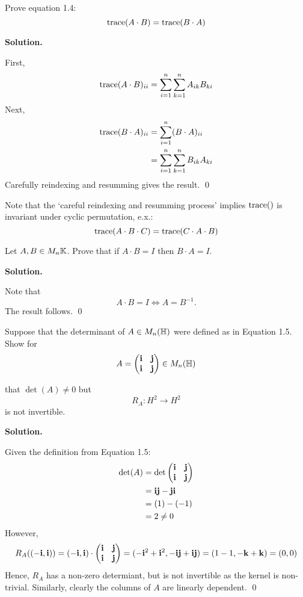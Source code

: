 \documentclass[12pt]{book}
\theoremstyle{definition}
\newenvironment{solution}
{%
  \par\noindent\textbf{Solution.}\quad
}
{%
  \qed\par
}
\begin{document}
\begin{taggedexercise}[Complete]
  Prove equation 1.4:
\[
\text{trace}({A \cdot B}) = \text{trace}({B \cdot A})
\]
\end{taggedexercise}

\begin{solution}
  First,
  \[
    \begin{aligned}
      \text{trace}({A \cdot B})_{ii} &= \sum_{i=1}^n \sum_{k=1}^n A_{ik}B_{ki} \\
   \end{aligned}
  \]
  Next,
  \[
    \begin{aligned}
      \text{trace}({B \cdot A})_{ii} &= \sum_{i=1}^{n} (B \cdot A)_{ii} \\
                          &= \sum_{i=1}^n \sum_{k=1}^n B_{ik}A_{ki} \\
   \end{aligned}
  \]
  Carefully reindexing and resumming gives the result.
\end{solution}
Note that the `careful reindexing and resumming process' implies $\text{trace}({})$ is invariant under cyclic permutation, e.x.:
\[
  \text{trace}({A \cdot B \cdot C}) = \text{trace}({C \cdot A \cdot B})
\]

\begin{taggedexercise}[Complete]
  Let $A, B \in M_n{\mathbb{K}}$. Prove that if $A \cdot B = I$ then $B \cdot A = I$.
\end{taggedexercise}

\begin{solution}
  Note that
  \[
  A \cdot B = I \iff A = B^{-1}.
  \]
  The result follows.
\end{solution}

\begin{taggedexercise}[Complete]
  Suppose that the determinant of $A \in M_n(\mathbb{H})$ were defined as in Equation 1.5. Show for 
\[
  A = \begin{pmatrix} \mathbf{i} & \mathbf{j} \\ \mathbf{i} & \mathbf{j} \end{pmatrix} \in M_n(\mathbb{H})
\]

that $\det(A) \neq 0$ but 
\[
R_A: H^2 \to H^2
\]
is not invertible.
\end{taggedexercise}

\begin{solution}
  Given the definition from Equation 1.5:
  \[
    \begin{aligned}
      \det (A) &= \det \begin{pmatrix} \mathbf{i} & \mathbf{j} \\ \mathbf{i} & \mathbf{j} \end{pmatrix} \\
               &= \mathbf{i} \mathbf{j} - \mathbf{j} \mathbf{i} \\
               &= (1) - (-1) \\
               &= 2 \neq 0 \\
   \end{aligned}
  \]
  However,
  \[
  R_A((-\mathbf{i}, \mathbf{i})) = (-\mathbf{i}, \mathbf{i}) \cdot \begin{pmatrix} \mathbf{i} & \mathbf{j} \\ \mathbf{i} & \mathbf{j} \end{pmatrix} = (-\mathbf{i}^2 + \mathbf{i}^2, -\mathbf{i}\mathbf{j} + \mathbf{i}\mathbf{j}) = (1 - 1, -\mathbf{k} + \mathbf{k}) = (0, 0)
  \]
  Hence, $R_A$ has a non-zero determiant, but is not invertible as the kernel is non-trivial.
  Similarly, clearly the columns of $A$ are linearly dependent.
\end{solution}
\end{document}
